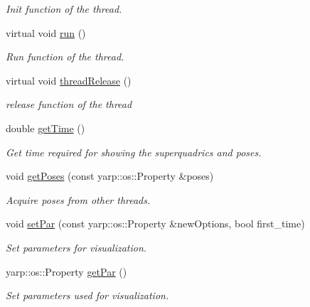 \begin{DoxyCompactItemize}
\begin{DoxyCompactList}\small\item\em Init function of the thread. \end{DoxyCompactList}\item 
virtual void \hyperlink{classGraspVisualization_a1498b5c983abd973e9482f2da97aa5c2}{run} ()\label{classGraspVisualization_a1498b5c983abd973e9482f2da97aa5c2}

\begin{DoxyCompactList}\small\item\em Run function of the thread. \end{DoxyCompactList}\item 
virtual void \hyperlink{classGraspVisualization_a1c25a50d14603a5cda42626afb4aaa47}{thread\+Release} ()\label{classGraspVisualization_a1c25a50d14603a5cda42626afb4aaa47}

\begin{DoxyCompactList}\small\item\em release function of the thread \end{DoxyCompactList}\item 
double \hyperlink{classGraspVisualization_ac9d26a90c1f1b6121ebbb0521053a80f}{get\+Time} ()
\begin{DoxyCompactList}\small\item\em Get time required for showing the superquadrics and poses. \end{DoxyCompactList}\item 
void \hyperlink{classGraspVisualization_a11fdc62f11352941ce39bf0444060290}{get\+Poses} (const yarp\+::os\+::\+Property \&poses)
\begin{DoxyCompactList}\small\item\em Acquire poses from other threads. \end{DoxyCompactList}\item 
void \hyperlink{classGraspVisualization_a68062fbac492b9277576f4ee871bdb41}{set\+Par} (const yarp\+::os\+::\+Property \&new\+Options, bool first\+\_\+time)
\begin{DoxyCompactList}\small\item\em Set parameters for visualization. \end{DoxyCompactList}\item 
yarp\+::os\+::\+Property \hyperlink{classGraspVisualization_a9071090277d53e90c6392b7e879e0247}{get\+Par} ()
\begin{DoxyCompactList}\small\item\em Set parameters used for visualization. \end{DoxyCompactList}\end{DoxyCompactItemize}
